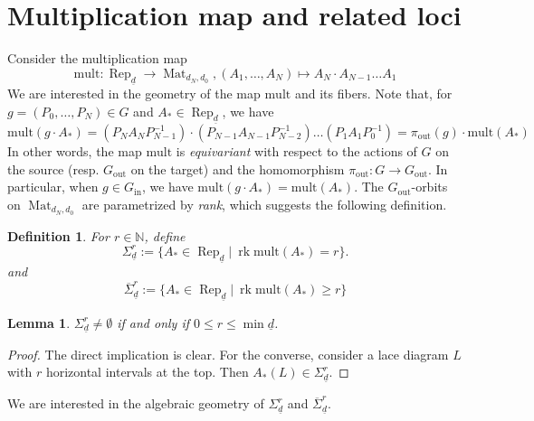 \documentclass[a4paper]{amsart}
\DeclareMathOperator{\rk}{rk}
\DeclareMathOperator{\Rep}{\mathrm{Rep}}
\DeclareMathOperator{\Mat}{\mathrm{Mat}}
\newcommand{\N}{\mathbb{N}}
\newcommand{\ud}{\underline{d}}
\newcommand{\ins}{\mathrm{in}}
\newcommand{\out}{\mathrm{out}}
\newcommand{\mult}{\mathrm{mult}}
\newcommand{\cSigma}{\overline{\Sigma}}
\newtheorem{lemma}[thm]{Lemma}
\newtheorem{defn}[thm]{Definition}
\theoremstyle{plain}
\begin{document}
\section{Multiplication map and related loci}\label{sec:mult}

Consider the multiplication map
\[
\mult:\Rep_{\ud}\to \Mat_{d_{N},d_0}, (A_1,\ldots,A_N)\mapsto A_N\cdot A_{N-1}\ldots A_1
\]
We are interested in the geometry of the map $\mult$ and its fibers. Note that, for $g=(P_0,\ldots,P_N)\in G$ and $A_*\in \Rep_{\ud}$, we have
\begin{equation}\label{mu_equiv}
    \mult(g\cdot A_*)= (P_N A_N P^{-1}_{N-1})\cdot (P_{N-1} A_{N-1} P^{-1}_{N-2})\ldots (P_1 A_1 P_0^{-1})= \pi_\out(g)\cdot \mult(A_*)
\end{equation}
In other words, the map $\mult$ is \emph{equivariant} with respect to the actions of $G$ on the source (resp. $G_\out$ on the target) and the homomorphism $\pi_\out:G\to G_\out$. In particular, when $g\in G_\ins$, we have $\mult(g\cdot A_*)=\mult(A_*)$. The $G_\out$-orbits on $\Mat_{d_{N},d_0}$ are parametrized by {\em rank}, which suggests the following definition.

\begin{defn}
For $r\in \N$, define
\[
\Sigma_{\ud}^r:=\{A_*\in\Rep_{\ud} |\ \rk \mult(A_*)= r\}.
\]
and 
\[
\cSigma_{\ud}^r:=\{A_*\in\Rep_{\ud} |\ \rk \mult(A_*)\geq r\}
\]
\end{defn}

\begin{lemma}\label{lem:sigma_non_empty}
   $\Sigma_{\ud}^r\neq\emptyset$ if and only if $0\leq r\leq \min\ud$.
\end{lemma}
\begin{proof}
    The direct implication is clear. For the converse, consider a lace diagram $L$ with $r$ horizontal intervals at the top. Then $A_*(L)\in \Sigma_{\ud}^r$.
\end{proof}

We are interested in the algebraic geometry of $\Sigma_{\ud}^r$ and $\cSigma_{\ud}^r$.
\end{document}
